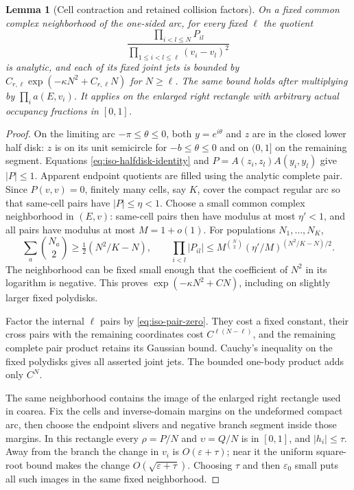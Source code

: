 \documentclass[11pt]{article}
\numberwithin{equation}{section}
\newtheorem{lemma}[theorem]{Lemma}
\theoremstyle{definition}
\newcommand{\eps}{\varepsilon}
\begin{document}
\begin{lemma}[Cell contraction and retained collision factors]
\label{lem:iso-cell-gaussian}
On a fixed common complex neighborhood of the one-sided arc, for
every fixed $\ell$ the quotient
\[
 \frac{\prod_{i<l\le N}P_{il}}
      {\prod_{1\le i<l\le\ell}(v_i-v_l)^2}
\]
is analytic, and each of its fixed joint jets is bounded by
$C_{r,\ell}\exp(-\kappa N^2+C_{r,\ell}N)$ for $N\ge\ell$.
The same bound holds after multiplying by $\prod_i a({E},v_i)$.
It applies on the enlarged right rectangle with arbitrary actual
occupancy fractions in $[0,1]$.
\end{lemma}
\begin{proof}
On the limiting arc $-\pi\le\theta\le0$, both $y=e^{i\theta}$ and
$z$ are in the closed lower half disk: $z$ is on its unit semicircle
for $-b\le\theta\le0$ and on $(0,1]$ on the remaining segment.
Equations \eqref{eq:iso-halfdisk-identity} and $P=A(z_i,z_l)A(y_i,y_l)$
give $|P|\le1$.  Apparent endpoint quotients are filled using the
analytic complete pair.  Since $P(v,v)=0$, finitely many cells,
say $K$, cover the compact regular arc so that same-cell pairs have
$|P|\le\eta<1$.  Choose a small common complex neighborhood in
$({E},v)$: same-cell pairs then have modulus at most
$\eta'<1$, and all pairs have modulus at most $M=1+o(1)$.
For populations $N_1,\ldots,N_K$,
\[
 \sum_a\binom{N_a}{2}\ge\tfrac12(N^2/K-N),\qquad
 \prod_{i<l}|P_{il}|
 \le M^{\binom N2}(\eta'/M)^{(N^2/K-N)/2}.
\]
The neighborhood can be fixed small enough that the coefficient of
$N^2$ in its logarithm is negative.  This proves
$\exp(-\kappa N^2+CN)$, including on slightly larger fixed polydisks.

Factor the internal $\ell$ pairs by \eqref{eq:iso-pair-zero}.
They cost a fixed constant, their cross pairs with the remaining
coordinates cost $C^{\ell(N-\ell)}$, and the remaining complete
pair product retains its Gaussian bound.  Cauchy's inequality on the
fixed polydisks gives all asserted joint jets.  The bounded one-body
product adds only $C^N$.

The same neighborhood contains the image of the enlarged right
rectangle used in coarea. Fix the cells and inverse-domain margins
on the undeformed compact arc, then choose the endpoint slivers and
negative branch segment inside those margins. In this rectangle every
$\rho=P/N$ and $\upsilon=Q/N$ is in $[0,1]$, and
$|h_i|\le\tau$.  Away from the branch the change in $v_i$ is
$O(\eps+\tau)$; near it the uniform square-root bound makes the
change $O(\sqrt{\eps+\tau})$.  Choosing $\tau$ and then $\eps_0$
small puts all such images in the same fixed neighborhood.
\end{proof}
\end{document}
